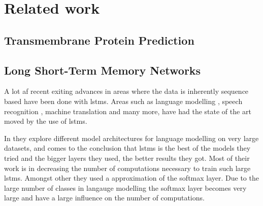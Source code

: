 \section{Related work}
\subsection{Transmembrane Protein Prediction}
% 



\subsection{Long Short-Term Memory Networks}

A lot af recent exiting advances in areas where the data is inherently sequence based 
have been done with \glspl{lstm}. Areas such as language modelling \cite{JozefowiczEtAl, ShazeerEtAl},
speech recognition \cite{XiongEtAl}, machine translation \cite{WuEtAl} and many more, have had the 
state of the art moved by the use of \glspl{lstm}. 


In \cite{JozefowiczEtAl} they explore different model architectures for language modelling 
on very large datasets, and comes to the conclusion that \glspl{lstm} is the best of the models
they tried and the bigger layers they used, the better results they got. Most of their work is
in decreasing the number of computations necessary to train such large \glspl{lstm}. 
Amongst other they used a approximation of the softmax layer. Due to the large number of 
classes in langauge modelling the softmax layer becomes very large and have a large influence 
on the number of computations. 